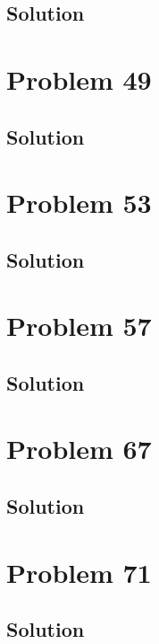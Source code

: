 \documentclass[12pt]{article}
\begin{document}
        \subsection{Solution}

    \pagebreak
    \section{Problem 49}

        \subsection{Solution}

    \pagebreak
    \section{Problem 53}

        \subsection{Solution}

    \pagebreak
    \section{Problem 57}

        \subsection{Solution}

    \pagebreak
    \section{Problem 67}

        \subsection{Solution}

    \pagebreak
    \section{Problem 71}

        \subsection{Solution}

    \pagebreak

    \tableofcontents
\end{document}
